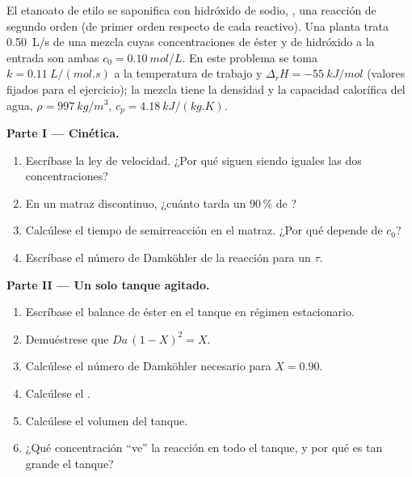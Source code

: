 \begin{problem}
\label{pb:b2:continuous-reactors:1}
El etanoato de etilo se saponifica con hidróxido de sodio,
, una reacción de segundo orden (de primer
orden respecto de cada reactivo). Una planta trata \qty{0.50}{L/s} de una mezcla cuyas
concentraciones de éster y de hidróxido a la entrada son ambas $c_0 =
\qty{0.10}{mol/L}$. En este problema se toma $k = \qty{0.11}{L/(mol.s)}$ a la
temperatura de trabajo y $\Delta_r H = \qty{-55}{kJ/mol}$ (valores fijados para el
ejercicio); la mezcla tiene la densidad y la capacidad calorífica del agua,
$\rho = \qty{997}{kg/m^3}$, $c_p = \qty{4.18}{kJ/(kg.K)}$.

\medskip
\noindent\textbf{Parte I --- Cinética.}
\begin{enumerate}
  \item Escríbase la ley de velocidad. ¿Por qué siguen siendo iguales las dos concentraciones?
  \item En un matraz discontinuo, ¿cuánto tarda un 90\,\% de ?
  \item Calcúlese el tiempo de semirreacción en el matraz. ¿Por qué depende de $c_0$?
  \item Escríbase el número de Damköhler de la reacción para un  $\tau$.
\end{enumerate}

\medskip
\noindent\textbf{Parte II --- Un solo tanque agitado.}
\begin{enumerate}[resume]
  \item Escríbase el balance de éster en el tanque en régimen estacionario.
  \item Demuéstrese que $Da\,(1 - X)^2 = X$.
  \item Calcúlese el número de Damköhler necesario para $X = 0.90$.
  \item Calcúlese el .
  \item Calcúlese el volumen del tanque.
  \item ¿Qué concentración ``ve'' la reacción en todo el tanque,
        y por qué es tan grande el tanque?
\end{enumerate}


\end{problem}
